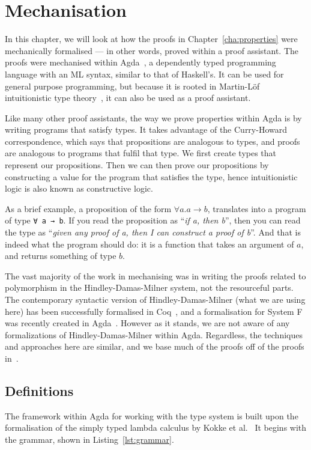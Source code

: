 \chapter{Mechanisation}\label{cha:mechanisation}
In this chapter, we will look at how the proofs in
Chapter~\ref{cha:properties} were mechanically formalised --- in other
words, proved within a proof assistant.  The proofs were mechanised
within Agda~\cite{norell2009}, a dependently typed programming
language with an ML syntax, similar to that of Haskell's. It can be
used for general purpose programming, but because it is rooted in
Martin-Löf intuitionistic type theory~\cite{martin-lof1984}, it can
also be used as a proof assistant.

Like many other proof assistants, the way we prove properties within
Agda is by writing programs that satisfy types. It takes advantage of
the Curry-Howard correspondence, which says that propositions are
analogous to types, and proofs are analogous to programs that fulfil
that type. We first create types that represent our
propositions. Then we can then prove our propositions by constructing
a value for the program that satisfies the type, hence intuitionistic
logic is also known as constructive logic.

As a brief example, a proposition of the form
$\forall a. a \rightarrow b$, translates into a program of type \texttt{∀ a → b}. If you read the proposition as ``\textit{if a, then b}'', then
you can read the type as ``\textit{given any proof of a, then I can
  construct a proof of b}''. And that is indeed what the program
should do: it is a function that takes an argument of $a$, and returns
something of type $b$.

The vast majority of the work in mechanising was in writing the proofs
related to polymorphism in the Hindley-Damas-Milner system, not the
resourceful parts. The contemporary syntactic version of
Hindley-Damas-Milner (what we are using here) has been successfully
formalised in Coq~\cite{dubois2000}, and a formalisation for System F
was recently created in Agda~\cite{chapman2019}. However as it stands,
we are not aware of any formalizations of Hindley-Damas-Milner within
Agda. Regardless, the techniques and approaches here are similar, and
we base much of the proofs off of the proofs in~\cite{wright1994}.

\section{Definitions}
The framework within Agda for working with the type system is built
upon the formalisation of the simply typed lambda calculus by Kokke et
al.~\cite{kokke2020} It begins with the grammar, shown in
Listing~\ref{lst:grammar}.

